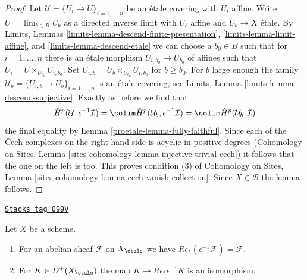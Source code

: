 \begin{proof}
\medskip\noindent
Let $\mathcal{U} = \{U_i \to U\}_{i = 1, \ldots, n}$ be an \'etale covering
with $U_i$ affine. Write $U = \lim_{b \in B} U_b$ as a directed inverse limit
with $U_b$ affine and $U_b \to X$ \'etale.
By Limits, Lemmas \ref{limits-lemma-descend-finite-presentation},
\ref{limits-lemma-limit-affine}, and
\ref{limits-lemma-descend-etale}
we can choose a $b_0 \in B$ such that for $i = 1, \ldots, n$ there is an
\'etale morphism $U_{i, b_0} \to U_{b_0}$ of affines
such that $U_i = U \times_{U_{b_0}} U_{i, b_0}$.
Set $U_{i, b} = U_b \times_{U_{b_0}} U_{i, b_0}$ for $b \geq b_0$.
For $b$ large enough the family
$\mathcal{U}_b = \{U_{i, b} \to U_b\}_{i = 1, \ldots, n}$
is an \'etale covering, see
Limits, Lemma \ref{limits-lemma-descend-surjective}.
Exactly as before we find that
$$
\check{H}^p(\mathcal{U}, \epsilon^{-1}\mathcal{I}) =
\colim \check{H}^p(\mathcal{U}_b, \epsilon^{-1}\mathcal{I}) =
\colim \check{H}^p(\mathcal{U}_b, \mathcal{I})
$$
the final equality by Lemma \ref{proetale-lemma-fully-faithful}.
Since each of the {\v C}ech complexes on the right hand side is
acyclic in positive degrees
(Cohomology on Sites, Lemma
\ref{sites-cohomology-lemma-injective-trivial-cech})
it follows that the one on the left is too. This proves condition (3) of
Cohomology on Sites, Lemma \ref{sites-cohomology-lemma-cech-vanish-collection}.
Since $X \in \mathcal{B}$ the lemma follows.
\end{proof}

\begin{lemma}
\label{proetale-lemma-relative-comparison}
\href{https://stacks.math.columbia.edu/tag/099V}{\texttt{Stacks tag 099V}}

Let $X$ be a scheme.
\begin{enumerate}
\item For an abelian sheaf $\mathcal{F}$ on $X_\etale$
we have $R\epsilon_*(\epsilon^{-1}\mathcal{F}) = \mathcal{F}$.
\item For $K \in D^+(X_\etale)$ the map $K \to R\epsilon_*\epsilon^{-1}K$
is an isomorphism.
\end{enumerate}
\end{lemma}

